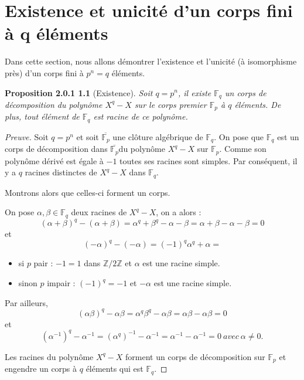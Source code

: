 ﻿\chapter{Existence et unicité d'un corps fini à q éléments}
\label{Existence et unicité d'un corps fini à q éléments}

	Dans cette section, nous allons démontrer l'existence et l'unicité (à isomorphisme près) d'un corps fini à $p^{n}=q$ éléments.
\newline

\newtheorem*{prop3}{Proposition 2.0.1}
\begin{prop3}[Existence]
	Soit $q=p^{n}$, il existe $\mathbb{F}_{q}$ un corps de décomposition du polynôme $X^{q}-X$ sur le corps premier $\mathbb{F}_{p}$ à $q$ éléments.
	De plus, tout élément de $\mathbb{F}_{q}$ est racine de ce polynôme.
\end{prop3}
\begin{proof}[Preuve]
Soit $q=p^{n}$ et soit $\overline{\mathbb{F}_{p}}$ une clôture algébrique de $\mathbb{F}_{q}$.
On pose que $\mathbb{F}_{q}$ est un corps de décomposition dans $\overline{\mathbb{F}_{p}}$du polynôme $X^{q}-X$ sur ${\mathbb{F}_{p}}$.
Comme son polynôme dérivé est égale à $-1$ toutes ses racines sont simples.
Par conséquent, il y a $q$ racines distinctes de $X^{q}-X$ dans $\mathbb{F}_{q}$.

Montrons alors que celles-ci forment un corps.

On pose $\alpha,\beta\in \mathbb{F}_{q}$ deux racines de $X^{q}-X$, on a alors :
$$(\alpha+\beta)^{q}-(\alpha+\beta)=\alpha^{q}+\beta^{q}-\alpha-\beta=\alpha+\beta-\alpha-\beta=0$$ et 
$$(-\alpha)^{q}-(-\alpha)=(-1)^{q}\alpha^{q}+\alpha =$$
\begin{itemize}
	\item si $p$ pair : $-1=1$ dans $\mathbb{Z}/2\mathbb{Z}$ et $\alpha$ est une racine simple.
	\item sinon $p$ impair : $(-1)^{q}=-1$ et $-\alpha$ est une racine simple.
\end{itemize}

Par ailleurs, $$(\alpha\beta)^{q}-\alpha\beta=\alpha^{q}\beta^{q}-\alpha\beta=\alpha\beta-\alpha\beta=0$$ et
$$(\alpha^{-1})^{q}-\alpha^{-1}=(\alpha^{q})^{-1}-\alpha^{-1}=\alpha^{-1}-\alpha^{-1}=0\ avec\ \alpha\neq0.$$

Les racines du polynôme $X^{q}-X$ forment un corps de décomposition sur $\mathbb{F}_{p}$ et engendre un corps à $q$ éléments qui est $\mathbb{F}_{q}$.
\end{proof}

